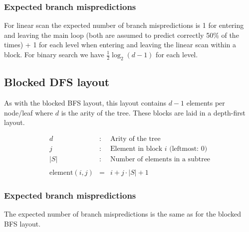 \subsubsection*{Expected branch mispredictions}

For linear scan the expected number of branch mispredictions is 1 for entering and leaving  the main loop (both are assumed to predict correctly 50\% of the times) + 1 for each level when entering and leaving the linear scan within a block. For binary search we have $\frac{1}{2} \log_2 (d-1)$ for each level.

\subsection{Blocked DFS layout}

As with the blocked BFS layout, this layout contains $d - 1$ elements per node/leaf where $d$ is the arity of the tree. These blocks are laid in a depth-first layout.

\begin{eqnarray*}
d & : & \textrm{Arity of the tree} \\
j & : & \textrm{Element in block $i$ (leftmost: $0$)} \\
|S| & : & \textrm{Number of elements in a subtree} \\
\\
\mathrm{element}(i, j) & = & i + j\cdot |S| + 1
\end{eqnarray*}

\subsubsection*{Expected branch mispredictions}

The expected number of branch mispredictions is the same as for the blocked BFS layout.